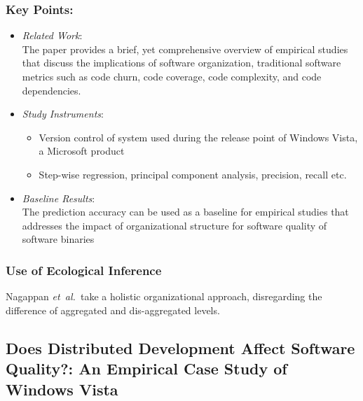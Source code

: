 \documentclass{sig-alternate-05-2015}
\newcommand{\etal}{\mbox{\emph{et al.\ }}}
\begin{document}
\subsubsection{Key Points:}
\begin{itemize}
\item \emph{Related Work}: \\
The paper provides a brief, yet comprehensive overview of empirical studies that discuss the implications of software organization, traditional software metrics such as code churn, code coverage, code complexity, and code dependencies.
\item \emph{Study Instruments}:
	\begin{itemize}
	\item Version control of system used during the release point of Windows Vista, a Microsoft product
 	\item Step-wise regression, principal component analysis, precision, recall etc.
	\end{itemize}
\item \emph{Baseline Results}: \\
The prediction accuracy can be used as a baseline for empirical studies that addresses the impact of organizational structure for software quality of software binaries
\end{itemize}

\subsubsection{Use of Ecological Inference}
Nagappan \etal take a holistic organizational approach, disregarding the difference of aggregated and dis-aggregated levels.

\subsection{Does Distributed Development Affect Software Quality?: An Empirical Case Study of Windows Vista \cite{Bird:2009}}
\end{document}
